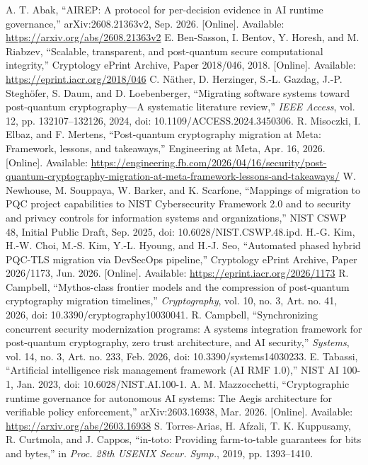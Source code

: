  A. T. Abak, ``AIREP: A protocol for per-decision evidence in AI runtime governance,'' arXiv:2608.21363v2, Sep. 2026. [Online]. Available: \url{https://arxiv.org/abs/2608.21363v2}
 E. Ben-Sasson, I. Bentov, Y. Horesh, and M. Riabzev, ``Scalable, transparent, and post-quantum secure computational integrity,'' Cryptology ePrint Archive, Paper 2018/046, 2018. [Online]. Available: \url{https://eprint.iacr.org/2018/046}
 C. N\"ather, D. Herzinger, S.-L. Gazdag, J.-P. Stegh\"ofer, S. Daum, and D. Loebenberger, ``Migrating software systems toward post-quantum cryptography---A systematic literature review,'' \emph{IEEE Access}, vol. 12, pp. 132107--132126, 2024, doi: 10.1109/ACCESS.2024.3450306.
 R. Misoczki, I. Elbaz, and F. Mertens, ``Post-quantum cryptography migration at Meta: Framework, lessons, and takeaways,'' Engineering at Meta, Apr. 16, 2026. [Online]. Available: \url{https://engineering.fb.com/2026/04/16/security/post-quantum-cryptography-migration-at-meta-framework-lessons-and-takeaways/}
 W. Newhouse, M. Souppaya, W. Barker, and K. Scarfone, ``Mappings of migration to PQC project capabilities to NIST Cybersecurity Framework 2.0 and to security and privacy controls for information systems and organizations,'' NIST CSWP 48, Initial Public Draft, Sep. 2025, doi: 10.6028/NIST.CSWP.48.ipd.
 H.-G. Kim, H.-W. Choi, M.-S. Kim, Y.-L. Hyoung, and H.-J. Seo, ``Automated phased hybrid PQC-TLS migration via DevSecOps pipeline,'' Cryptology ePrint Archive, Paper 2026/1173, Jun. 2026. [Online]. Available: \url{https://eprint.iacr.org/2026/1173}
 R. Campbell, ``Mythos-class frontier models and the compression of post-quantum cryptography migration timelines,'' \emph{Cryptography}, vol. 10, no. 3, Art. no. 41, 2026, doi: 10.3390/cryptography10030041.
 R. Campbell, ``Synchronizing concurrent security modernization programs: A systems integration framework for post-quantum cryptography, zero trust architecture, and AI security,'' \emph{Systems}, vol. 14, no. 3, Art. no. 233, Feb. 2026, doi: 10.3390/systems14030233.
 E. Tabassi, ``Artificial intelligence risk management framework (AI RMF 1.0),'' NIST AI 100-1, Jan. 2023, doi: 10.6028/NIST.AI.100-1.
 A. M. Mazzocchetti, ``Cryptographic runtime governance for autonomous AI systems: The Aegis architecture for verifiable policy enforcement,'' arXiv:2603.16938, Mar. 2026. [Online]. Available: \url{https://arxiv.org/abs/2603.16938}
 S. Torres-Arias, H. Afzali, T. K. Kuppusamy, R. Curtmola, and J. Cappos, ``in-toto: Providing farm-to-table guarantees for bits and bytes,'' in \emph{Proc. 28th USENIX Secur. Symp.}, 2019, pp. 1393--1410.
